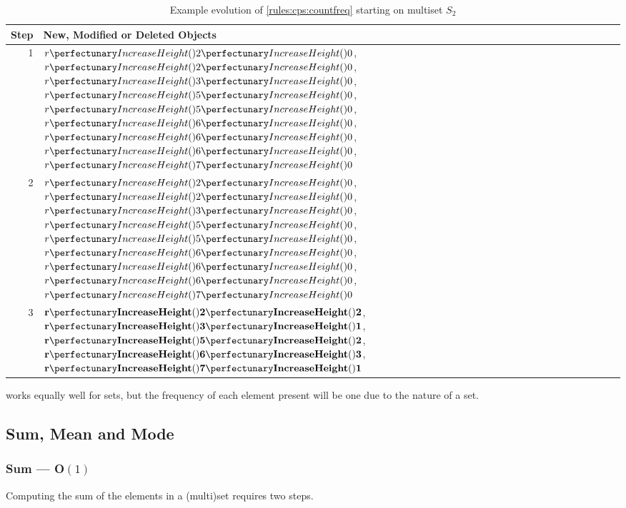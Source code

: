 \begin{table} \centering
   \begin{tabular}{|r|l|}
    \hline
    \textbf{Step} & \textbf{New, Modified or Deleted Objects} \\ \hline
    1 & \(\cpfuncn{r}{2}{0}\), \(\cpfuncn{r}{2}{0}\), \(\cpfuncn{r}{3}{0}\), \(\cpfuncn{r}{5}{0}\), \(\cpfuncn{r}{5}{0}\), \(\cpfuncn{r}{6}{0}\), \(\cpfuncn{r}{6}{0}\), \(\cpfuncn{r}{6}{0}\), \(\cpfuncn{r}{7}{0}\)\\ \hline
    
    
    2 & \(\cpfuncn{r}{2}{0}\), \sout{\(\cpfuncn{r}{2}{0}\)}, \(\cpfuncn{r}{3}{0}\), \(\cpfuncn{r}{5}{0}\), \sout{\(\cpfuncn{r}{5}{0}\)}, \(\cpfuncn{r}{6}{0}\), \sout{\(\cpfuncn{r}{6}{0}\)}, \sout{\(\cpfuncn{r}{6}{0}\)}, \(\cpfuncn{r}{7}{0}\)\\ \hline
    
    3 & \(\mathbf{\cpfuncn{r}{2}{2}}\), \(\mathbf{\cpfuncn{r}{3}{1}}\), \(\mathbf{\cpfuncn{r}{5}{2}}\), \(\mathbf{\cpfuncn{r}{6}{3}}\), \(\mathbf{\cpfuncn{r}{7}{1}}\)\\ \hline
\end{tabular}
\caption[Example evolution of \cref{rules:cps:countfreq}]{\label{tab:cps:countfreq}Example evolution of \cref{rules:cps:countfreq} starting on multiset \(S_2\)}
\end{table}

 works equally well for sets, but the frequency of each element present will be one due to the nature of a set.

\subsection{Sum, Mean and Mode}\label{sec:cps:sumeanmode}

\subsubsection{Sum --- O\((1)\)}\label{sec:cps:sum}

\begin{proposition}\label{prop:cps:sum}
Computing the sum of the elements in a (multi)set requires two steps.
\end{proposition}

